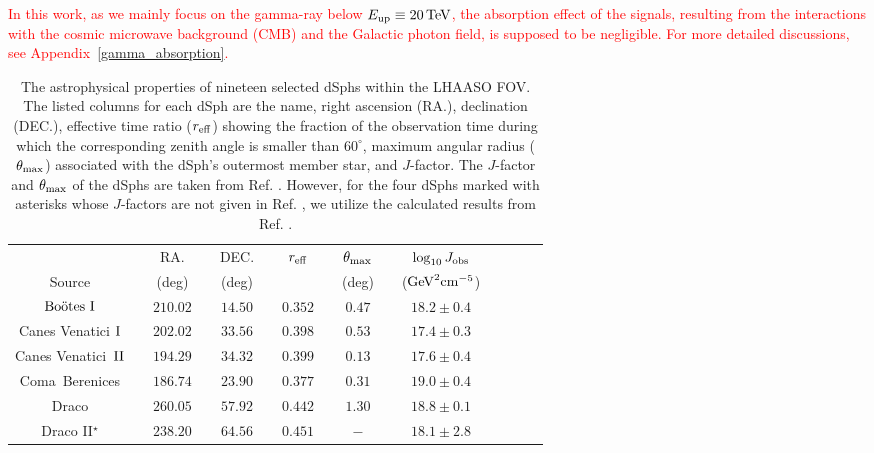 \documentclass[12pt,aps,prd,amsmath,amssymb,showpacs,floats,floatfix,nofootinbib]{revtex4-1}
\def\red#1{{\textcolor{red}{#1}}} %
\def\TeV{\mathrm{TeV}} %
\def\GeV{\mathrm{GeV}} %
\begin{document}
\red{
In this work, as we mainly focus on the gamma-ray below $E_{\rm up}\equiv20\,\TeV$, the absorption effect of the signals, resulting from the interactions with the cosmic microwave background (CMB) and the Galactic photon field, is supposed to be negligible. For more detailed discussions, see Appendix~\ref{gamma_absorption}.
}

\begin{table}
\caption{\label{Table:dsphs}The astrophysical properties of nineteen selected dSphs within the LHAASO FOV.
The listed columns for each dSph are the name, right ascension (RA.), declination (DEC.),
effective time ratio ($r_{\rm eff}$) showing the fraction of the observation time during which the corresponding zenith angle is smaller than $60^\circ$,
maximum angular radius ($\rm \theta_{max}$) associated with the dSph's outermost member star,
and $J$-factor.
The $J$-factor and $\rm \theta_{max}$ of the dSphs are taken from Ref. \cite{Geringer-Sameth:2014yza}. However, for the four dSphs marked with asterisks whose $J$-factors are not given in Ref. \cite{Geringer-Sameth:2014yza}, we utilize the calculated results from Ref. \cite{Hutten:2016jko}.}
\small\centering
\begin{tabular}{ccccccccccccccc} \hline \hline
              &&
          RA. &&
          DEC.&&
          $r_{\rm eff}$&&
          $\theta_{\rm max}$&&
          $\log_{10}J_{\rm obs}$&&\\
		
       Source&&
		(deg)&&
		(deg)&&
		     &&
		(deg)&&
		($\GeV^{2}\rm cm^{-5}$)\\\hline


		$\rm Bo\ddot{o}tes ~I$&&
		$210.02$&&
		$14.50$&&
		$0.352$&&
		$0.47$&&	
		$18.2\pm0.4$\\
		
		
		Canes Venatici $\rm I$&&
		$202.02$&&
		$33.56$&&
		$0.398$&&
		$0.53$&&
		$17.4\pm0.3$\\
		
		Canes Venatici~$\rm II$&&
		$194.29$&&
		$34.32$&&
		$0.399$&&
		$0.13$&&
		$17.6\pm0.4$\\
		
		Coma~Berenices&&
		$186.74$&&
		$23.90$&&
		$0.377$&&
		$0.31$&&
		$19.0\pm0.4$\\
		
		Draco&&
		$260.05$&&
		$57.92$&&
		$0.442$&&
		$1.30$&&
		$18.8\pm0.1$\\

		Draco II$^{\star}$&&
		$238.20$&&
		$64.56$&&
		$0.451$&&
		$-$&&
		$18.1\pm2.8$\\
		

\end{tabular}
\end{table}
\end{document}
